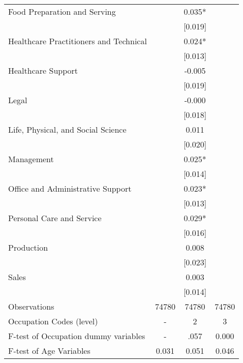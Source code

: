 \documentclass[10pt,letterpaper,subeqn]{beamer}
\begin{document}
\begin{frame}[label=occReg]
\begin{table}[htbp]
{\begin{tabular}{l*{3}{c}}
Food Preparation and Serving &               &       0.035*  &               \\
                    &               &     [0.019]   &               \\
Healthcare Practitioners and Technical &               &       0.024*  &               \\
                    &               &     [0.013]   &               \\
Healthcare Support &               &      -0.005   &               \\
                    &               &     [0.019]   &               \\
Legal &               &      -0.000   &               \\
                    &               &     [0.018]   &               \\
Life, Physical, and Social Science &               &       0.011   &               \\
                    &               &     [0.020]   &               \\
Management &               &       0.025*  &               \\
                    &               &     [0.014]   &               \\
Office and Administrative Support &               &       0.023*  &               \\
                    &               &     [0.013]   &               \\
Personal Care and Service &               &       0.029*  &               \\
                    &               &     [0.016]   &               \\
Production &               &       0.008   &               \\
                    &               &     [0.023]   &               \\
Sales &               &       0.003   &               \\
                    &               &     [0.014]   &               \\
\midrule
Observations        &       74780   &       74780   &       74780   \\
Occupation Codes (level) &-&2&3\\
F-test of Occupation dummy variables&-&.057&0.000\\
F-test of Age Variables&0.031&0.051&0.046\\ \bottomrule
\end{tabular}}\end{table}
\end{frame}
\end{document}
